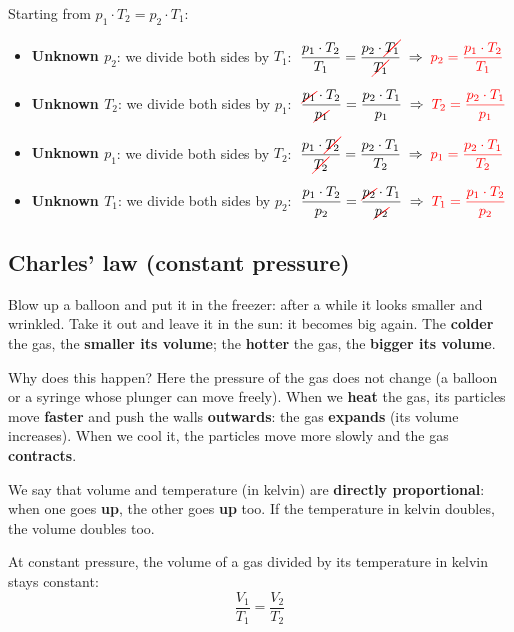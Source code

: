 Starting from \(p_1 \cdot T_2 = p_2 \cdot T_1\):
\begin{itemize}
    \item \textbf{Unknown \(p_2\)}: we divide both sides by \(T_1\):
    \(\;\dfrac{p_1 \cdot T_2}{T_1} = \dfrac{p_2 \cdot \cancelred{T_1}}{\cancelred{T_1}} \;\Rightarrow\; \textcolor{red}{p_2 = \dfrac{p_1 \cdot T_2}{T_1}}\)
    \item \textbf{Unknown \(T_2\)}: we divide both sides by \(p_1\):
    \(\;\dfrac{\cancelred{p_1} \cdot T_2}{\cancelred{p_1}} = \dfrac{p_2 \cdot T_1}{p_1} \;\Rightarrow\; \textcolor{red}{T_2 = \dfrac{p_2 \cdot T_1}{p_1}}\)
    \item \textbf{Unknown \(p_1\)}: we divide both sides by \(T_2\):
    \(\;\dfrac{p_1 \cdot \cancelred{T_2}}{\cancelred{T_2}} = \dfrac{p_2 \cdot T_1}{T_2} \;\Rightarrow\; \textcolor{red}{p_1 = \dfrac{p_2 \cdot T_1}{T_2}}\)
    \item \textbf{Unknown \(T_1\)}: we divide both sides by \(p_2\):
    \(\;\dfrac{p_1 \cdot T_2}{p_2} = \dfrac{\cancelred{p_2} \cdot T_1}{\cancelred{p_2}} \;\Rightarrow\; \textcolor{red}{T_1 = \dfrac{p_1 \cdot T_2}{p_2}}\)
\end{itemize}


\subsection{Charles' law (constant pressure)}

 Blow up a balloon and put it in the freezer: after a while it looks smaller and wrinkled. Take it out and leave it in the sun: it becomes big again. The \textbf{colder} the gas, the \textbf{smaller its volume}; the \textbf{hotter} the gas, the \textbf{bigger its volume}.

Why does this happen? Here the pressure of the gas does not change (a balloon or a syringe whose plunger can move freely). When we \textbf{heat} the gas, its particles move \textbf{faster} and push the walls \textbf{outwards}: the gas \textbf{expands} (its volume increases). When we cool it, the particles move more slowly and the gas \textbf{contracts}.

We say that volume and temperature (in kelvin) are \textbf{directly proportional}: when one goes \textbf{up}, the other goes \textbf{up} too. If the temperature in kelvin doubles, the volume doubles too.

\begin{definition}
    At constant pressure, the volume of a gas divided by its temperature in kelvin stays constant:
    \begin{equation*}
        \dfrac{V_1}{T_1} = \dfrac{V_2}{T_2}
    \end{equation*}
\end{definition}

